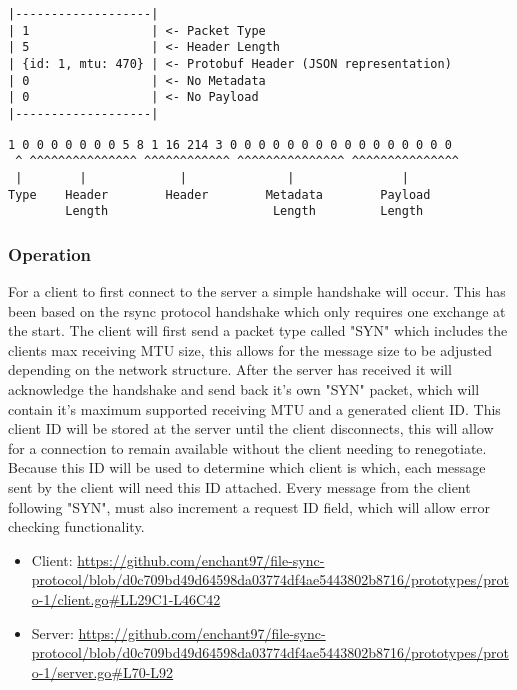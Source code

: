 \begin{minipage}{\textwidth}
    \begin{lstlisting}[caption={Prototype One Example Packet Structure},label=lst:p1d-example-structure]
|-------------------|
| 1                 | <- Packet Type
| 5                 | <- Header Length
| {id: 1, mtu: 470} | <- Protobuf Header (JSON representation)
| 0                 | <- No Metadata
| 0                 | <- No Payload
|-------------------|
\end{lstlisting}

    \begin{lstlisting}[caption={Prototype One Example Packet Binary},label=lst:p1d-example-binary]
 1 0 0 0 0 0 0 0 5 8 1 16 214 3 0 0 0 0 0 0 0 0 0 0 0 0 0 0 0 0
 ^ ^^^^^^^^^^^^^^^ ^^^^^^^^^^^^ ^^^^^^^^^^^^^^^ ^^^^^^^^^^^^^^^
 |        |             |              |               |
Type    Header        Header        Metadata        Payload
        Length                       Length         Length
\end{lstlisting}
\end{minipage}

\subsubsection*{Operation}
For a client to first connect to the server a simple handshake will occur. This has been based on the rsync protocol handshake which only requires one exchange at the start. The client will first send a packet type called "SYN" which includes the clients max receiving MTU size, this allows for the message size to be adjusted depending on the network structure. After the server has received it will acknowledge the handshake and send back it's own "SYN" packet, which will contain it's maximum supported receiving MTU and a generated client ID. This client ID will be stored at the server until the client disconnects, this will allow for a connection to remain available without the client needing to renegotiate. Because this ID will be used to determine which client is which, each message sent by the client will need this ID attached. Every message from the client following "SYN", must also increment a request ID field, which will allow error checking functionality.

\begin{itemize}
    \item Client: \url{https://github.com/enchant97/file-sync-protocol/blob/d0c709bd49d64598da03774df4ae5443802b8716/prototypes/proto-1/client.go#LL29C1-L46C42}
    \item Server: \url{https://github.com/enchant97/file-sync-protocol/blob/d0c709bd49d64598da03774df4ae5443802b8716/prototypes/proto-1/server.go#L70-L92}
\end{itemize}

